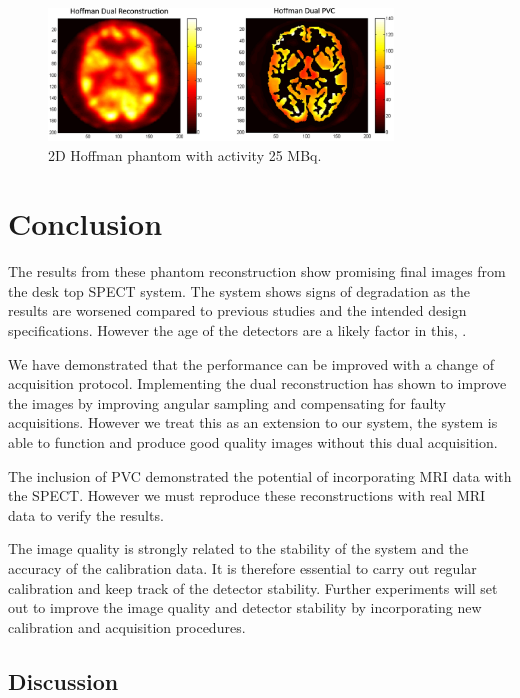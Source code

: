 \begin{figure}[!t]
\centering
\includegraphics[width=3.6in]{figures/Hoffman.png}

\caption{2D Hoffman phantom with activity 25 MBq.}
\label{fig_Hoffman}
\end{figure}

\section{Conclusion}
The results from these phantom reconstruction show promising final images from the desk top \acrshort{SPECT} system. The system shows signs of degradation as the results are worsened compared to previous studies and the intended design specifications. However the age of the detectors are a likely factor in this, \cite{Carminati2019ClinicalCharacterization}. 

We have demonstrated that the performance can be improved with a change of acquisition protocol. Implementing the dual reconstruction has shown to improve the images by improving angular sampling and compensating for faulty acquisitions. However we treat this as an extension to our system, the system is able to function and produce good quality images without this dual acquisition.

The inclusion of \acrshort{PVC} demonstrated the potential of incorporating \acrshort{MRI} data with the \acrshort{SPECT}. However we must reproduce these reconstructions with real \acrshort{MRI} data to verify the results. 

The image quality is strongly related to the stability of the system and the accuracy of the calibration data. It is therefore essential to carry out regular calibration and keep track of the detector stability. Further experiments will set out to improve the image quality and detector stability by incorporating new calibration and acquisition procedures. 

\subsection{Discussion}

